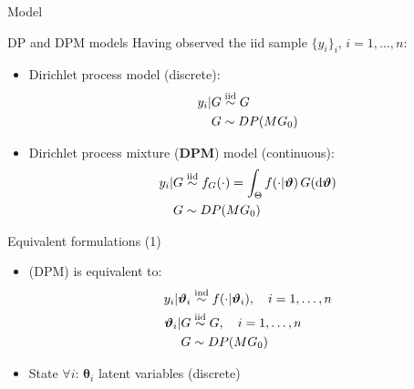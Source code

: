 \begin{frame}[c] %
	\begin{center}
		\huge \color{blue} Model
	\end{center}
\end{frame}


\begin{frame}{DP and DPM models} %
	Having observed the iid sample $\{y_i\}_i$, $i=1,\dots,n$:
	\begin{itemize}
		\item Dirichlet process model (discrete):
		\begin{align*}
		y_i | G &\stackrel{\text{iid}}{\sim} G \\
		G &\sim DP(MG_0)
		\end{align*}
		\item Dirichlet process mixture (\textbf{DPM}) model (continuous):
		\begin{align*}
		y_i | G &\stackrel{\text{iid}}{\sim} f_G(\cdot) = \int_\Theta f(\cdot|\boldsymbol{\vartheta}) \, G(\mathrm d\boldsymbol{\vartheta}) \\
		G &\sim DP(M G_0)
		\end{align*}
	\end{itemize}
\end{frame}


\begin{frame}{Equivalent formulations (1)} %
	\begin{itemize}
		\item (DPM) is equivalent to:
		\begin{align*}
		y_i | \boldsymbol{\vartheta}_i &\stackrel{\text{ind}}{\sim} f(\cdot|\boldsymbol{\vartheta}_i), \quad i=1,\dots,n \\
		\boldsymbol{\vartheta}_i | G &\stackrel{\text{iid}}{\sim} G, \quad i=1,\dots,n \\ 
		G &\sim DP(M G_0)
		\end{align*}
		\item State $\forall i$: $\boldsymbol\theta_i$ latent variables (discrete)
	\end{itemize}
\end{frame}

